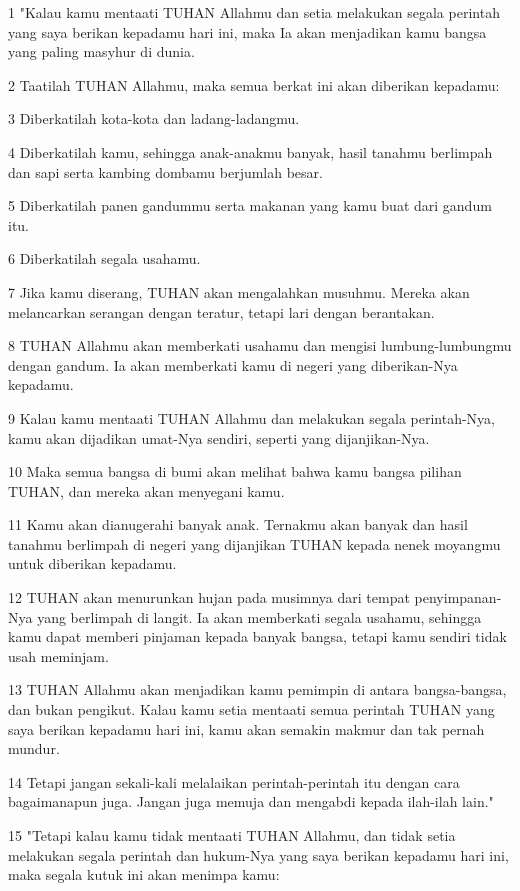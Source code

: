 \par 1 "Kalau kamu mentaati TUHAN Allahmu dan setia melakukan segala perintah yang saya berikan kepadamu hari ini, maka Ia akan menjadikan kamu bangsa yang paling masyhur di dunia.
\par 2 Taatilah TUHAN Allahmu, maka semua berkat ini akan diberikan kepadamu:
\par 3 Diberkatilah kota-kota dan ladang-ladangmu.
\par 4 Diberkatilah kamu, sehingga anak-anakmu banyak, hasil tanahmu berlimpah dan sapi serta kambing dombamu berjumlah besar.
\par 5 Diberkatilah panen gandummu serta makanan yang kamu buat dari gandum itu.
\par 6 Diberkatilah segala usahamu.
\par 7 Jika kamu diserang, TUHAN akan mengalahkan musuhmu. Mereka akan melancarkan serangan dengan teratur, tetapi lari dengan berantakan.
\par 8 TUHAN Allahmu akan memberkati usahamu dan mengisi lumbung-lumbungmu dengan gandum. Ia akan memberkati kamu di negeri yang diberikan-Nya kepadamu.
\par 9 Kalau kamu mentaati TUHAN Allahmu dan melakukan segala perintah-Nya, kamu akan dijadikan umat-Nya sendiri, seperti yang dijanjikan-Nya.
\par 10 Maka semua bangsa di bumi akan melihat bahwa kamu bangsa pilihan TUHAN, dan mereka akan menyegani kamu.
\par 11 Kamu akan dianugerahi banyak anak. Ternakmu akan banyak dan hasil tanahmu berlimpah di negeri yang dijanjikan TUHAN kepada nenek moyangmu untuk diberikan kepadamu.
\par 12 TUHAN akan menurunkan hujan pada musimnya dari tempat penyimpanan-Nya yang berlimpah di langit. Ia akan memberkati segala usahamu, sehingga kamu dapat memberi pinjaman kepada banyak bangsa, tetapi kamu sendiri tidak usah meminjam.
\par 13 TUHAN Allahmu akan menjadikan kamu pemimpin di antara bangsa-bangsa, dan bukan pengikut. Kalau kamu setia mentaati semua perintah TUHAN yang saya berikan kepadamu hari ini, kamu akan semakin makmur dan tak pernah mundur.
\par 14 Tetapi jangan sekali-kali melalaikan perintah-perintah itu dengan cara bagaimanapun juga. Jangan juga memuja dan mengabdi kepada ilah-ilah lain."
\par 15 "Tetapi kalau kamu tidak mentaati TUHAN Allahmu, dan tidak setia melakukan segala perintah dan hukum-Nya yang saya berikan kepadamu hari ini, maka segala kutuk ini akan menimpa kamu:
